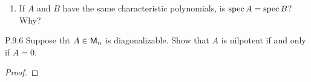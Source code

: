 \documentclass{../homework}
\begin{document}
\begin{problems}
\begin{enumerate}
\begin{solution}
    \end{solution}

  \item If \(A\) and \(B\) have the same characteristic polynomials,
    is \(\operatorname{spec} A = \operatorname{spec} B\)?  Why?

    \begin{solution}

    \end{solution}
  \end{enumerate}

\item[P.9.6] Suppose tht \(A \in \mathsf{M}_n\) is diagonalizable.  Show that
  \(A\) is nilpotent if and only if \(A = 0\).

  \begin{solution}
    \begin{proof}

    \end{proof}
  \end{solution}
\end{problems}
\end{document}
